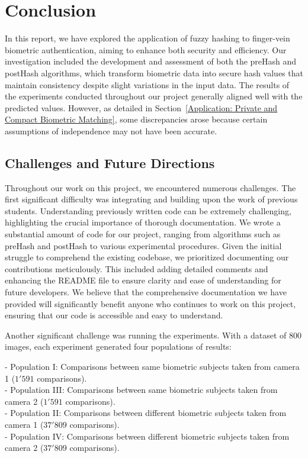 \newpage

\section{Conclusion}
In this report, we have explored the application of fuzzy hashing to finger-vein biometric authentication, aiming to enhance both security and efficiency. Our investigation included the development and assessment of both the preHash and postHash algorithms, which transform biometric data into secure hash values that maintain consistency despite slight variations in the input data. The results of the experiments conducted throughout our project generally aligned well with the predicted values. However, as detailed in Section~\ref{Application: Private and Compact Biometric Matching}, some discrepancies arose because certain assumptions of independence may not have been accurate.

\subsection{Challenges and Future Directions}
Throughout our work on this project, we encountered numerous challenges. The first significant difficulty was integrating and building upon the work of previous students. Understanding previously written code can be extremely challenging, highlighting the crucial importance of thorough documentation. We wrote a substantial amount of code for our project, ranging from algorithms such as preHash and postHash to various experimental procedures. Given the initial struggle to comprehend the existing codebase, we prioritized documenting our contributions meticulously. This included adding detailed comments and enhancing the README file to ensure clarity and ease of understanding for future developers. We believe that the comprehensive documentation we have provided will significantly benefit anyone who continues to work on this project, ensuring that our code is accessible and easy to understand.

Another significant challenge was running the experiments. With a dataset of 800 images, each experiment generated four populations of results:

- Population I: Comparisons between same biometric subjects taken from camera 1 (\(1'591\) comparisons).\\
- Population III: Comparisons between same biometric subjects taken from camera 2 (\(1'591\) comparisons).\\
- Population II: Comparisons between different biometric subjects taken from camera 1 (\(37'809\) comparisons).\\
- Population IV: Comparisons between different biometric subjects taken from camera 2 (\(37'809\) comparisons).

